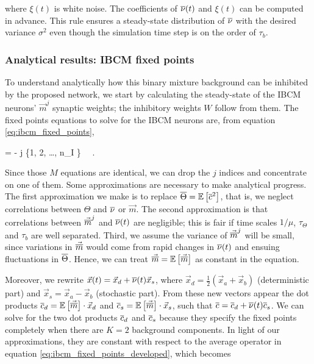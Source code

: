 where $\xi(t)$ is white noise. The coefficients of $\overline{\nu}(t)$ and $\xi(t)$ can be computed in advance. This rule ensures a steady-state distribution of $\overline{\nu}$ with the desired variance $\sigma^2$ even though the simulation time step is on the order of $\tau_b$. 


\subsubsection{Analytical results: IBCM fixed points}
\label{subsubsect:2d_model_analytical}

To understand analytically how this binary mixture background can be inhibited by the proposed network, we start by calculating the steady-state of the IBCM neurons' $\vec{m}^j$ synaptic weights; the inhibitory weights $W$ follow from them. The fixed points equations to solve for the IBCM neurons are, from equation \eqref{eq:ibcm_fixed_points}, 

 =  -  \quad \forall j \in \{1, 2, \ldots, n_I \} \, \, .
	\label{eq:ibcm_fixed_points_developed}
\eeq

Since those $M$ equations are identical, we can drop the $j$ indices and concentrate on one of them. Some approximations are necessary to make analytical progress. 
The first approximation we make is to replace $\overline{\Theta} = \mathbb{E}\left[ \overline{c}^2 \right]$, that is, we neglect correlations between $\Theta$ and $\overline{\nu}$ or $\vec{m}$. 
The second approximation is that correlations between $\vec{\overline{m}}^j$ and $\overline{\nu}(t)$ are negligible; this is fair if time scales $1/\mu$, $\tau_{\Theta}$ and $\tau_b$ are well separated. Third, we assume the variance of $\vec{\overline{m}}^j$ will be small, since variations in $\vec{\overline{m}}$ would come from rapid changes in $\overline{\nu}(t)$ and ensuing fluctuations in $\overline{\Theta}$. Hence, we can treat $\vec{\overline{m}} = \mathbb{E}\left[ \vec{\overline{m}} \right]$ as constant in the equation. 

Moreover, we rewrite $\vec{x}(t) = \vec{x}_d + \overline{\nu}(t) \vec{x}_s$, where $\vec{x}_d = \frac12 (\vec{x}_a + \vec{x}_b)$ (deterministic part) and $\vec{x}_s = \vec{x}_a - \vec{x}_b$ (stochastic part). From these new vectors appear the dot products $\overline{c}_d = \mathbb{E}\left[ \vec{\overline{m}} \right] \cdot \vec{x}_d$ and $\overline{c}_s = \mathbb{E}\left[ \vec{\overline{m}} \right] \cdot \vec{x}_s$, such that $\overline{c} = \overline{c}_d + \overline{\nu}(t) \overline{c}_s$. We can solve for the two dot products $\overline{c}_d$ and $\overline{c}_s$ because they specify the fixed points completely when there are $K=2$ background components. In light of our approximations, they are constant with respect to the average operator in equation \eqref{eq:ibcm_fixed_points_developed}, which becomes

